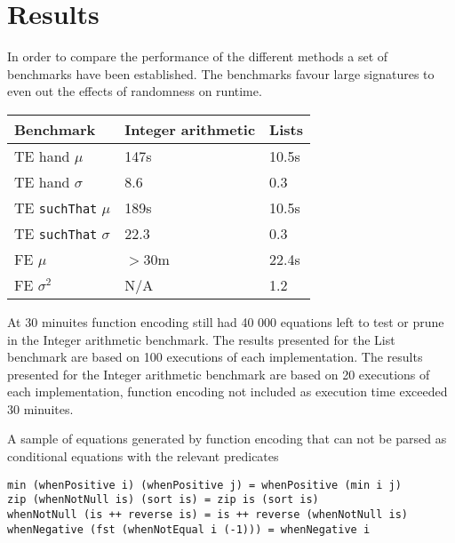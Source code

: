 \section{Results}\label{results}

In order to compare the performance of the different methods
a set of benchmarks have been established. The benchmarks favour
large signatures to even out the effects of randomness on runtime.

\begin{tabular}{|l|l|l|}
    \hline
    Benchmark                       & Integer arithmetic & Lists \\ \hline
    TE hand $\mu$                   & 147s               & 10.5s \\ \hline
    TE hand $\sigma$                & 8.6                & 0.3  \\ \hline
    TE \texttt{suchThat} $\mu$      & 189s               & 10.5s \\ \hline
    TE \texttt{suchThat} $\sigma$   & 22.3               & 0.3  \\ \hline
    FE $\mu$                        & $>$30m             & 22.4s \\ \hline
    FE $\sigma^2$                   & N/A                & 1.2  \\ \hline
\end{tabular}

At 30 minuites function encoding still had
40 000 equations left to test or prune in the Integer arithmetic benchmark.
The results presented for the List benchmark are based on 100 executions
of each implementation.
The results presented for the Integer arithmetic benchmark are based
on 20 executions of each implementation, function encoding not included as execution
time exceeded 30 minuites.

A sample of equations generated by function encoding that can not be parsed as conditional
equations with the relevant predicates
\begin{verbatim}
min (whenPositive i) (whenPositive j) = whenPositive (min i j)
zip (whenNotNull is) (sort is) = zip is (sort is)
whenNotNull (is ++ reverse is) = is ++ reverse (whenNotNull is)
whenNegative (fst (whenNotEqual i (-1))) = whenNegative i
\end{verbatim}
